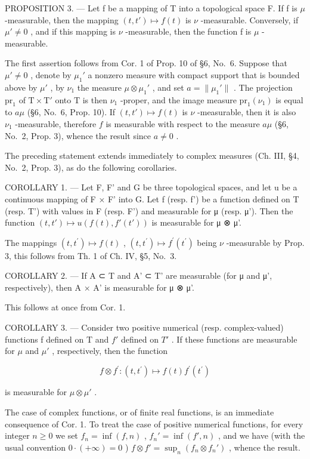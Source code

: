 PROPOSITION 3. --- Let f be a mapping of T into a topological space F. If f is \(\mu\) -measurable, then the mapping \((t, t') \mapsto f(t)\) is \(\nu\) -measurable. Conversely, if \(\mu' \neq 0\) , and if this mapping is \(\nu\) -measurable, then the function f is \(\mu\) -measurable.

The first assertion follows from Cor. 1 of Prop. 10 of §6, No.~6. Suppose that \(\mu' \neq 0\) , denote by \(\mu_1'\) a nonzero measure with compact support that is bounded above by \(\mu'\) , by \(\nu_1\) the measure \(\mu \otimes \mu_1'\) , and set \(a = \| \mu_1'\|\) . The projection \(\mathrm{pr}_1\) of \(\mathrm{T} \times \mathrm{T}'\) onto \(\mathrm{T}\) is then \(\nu_1\) -proper, and the image measure \(\mathrm{pr}_1(\nu_1)\) is equal to \(a\mu\) (§6, No.~6, Prop. 10). If \((t, t') \mapsto f(t)\) is \(\nu\) -measurable, then it is also \(\nu_1\) -measurable, therefore \(f\) is measurable with respect to the measure \(a\mu\) (§6, No.~2, Prop. 3), whence the result since \(a \neq 0\) .

The preceding statement extends immediately to complex measures (Ch. III, §4, No.~2, Prop. 3), as do the following corollaries.

COROLLARY 1. --- Let F, F' and G be three topological spaces, and let u be a continuous mapping of F × F' into G. Let f (resp. f') be a function defined on T (resp. T') with values in F (resp. F') and measurable for μ (resp. μ'). Then the function \((t, t') \mapsto u(f(t), f'(t'))\) is measurable for μ ⊗ μ'.

The mappings \((t,t^{\prime})\mapsto f(t)\) , \((t,t^{\prime})\mapsto f^{\prime}(t^{\prime})\) being \(\nu\) -measurable by Prop. 3, this follows from Th. 1 of Ch. IV, §5, No.~3.

COROLLARY 2. --- If A ⊂ T and A' ⊂ T' are measurable (for μ and μ', respectively), then A × A' is measurable for μ ⊗ μ'.

This follows at once from Cor. 1.

COROLLARY 3. --- Consider two positive numerical (resp. complex-valued) functions f defined on T and \(f'\) defined on \(T'\) . If these functions are measurable for \(\mu\) and \(\mu'\) , respectively, then the function

\[
f \otimes f ^ {\prime}: (t, t ^ {\prime}) \mapsto f (t) f ^ {\prime} (t ^ {\prime})
\]

is measurable for \(\mu \otimes \mu'\) .

The case of complex functions, or of finite real functions, is an immediate consequence of Cor. 1. To treat the case of positive numerical functions, for every integer \(n \geqslant 0\) we set \(f_n = \inf(f, n)\) , \(f_n' = \inf(f', n)\) , and we have (with the usual convention \(0 \cdot (+\infty) = 0\) ) \(f \otimes f' = \sup_n(f_n \otimes f_n')\) , whence the result.

